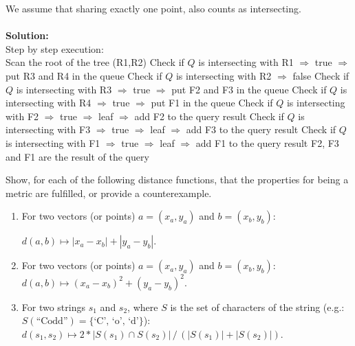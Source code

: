 \begin{enumerate}
  We assume that sharing exactly one point, also counts as intersecting.\\\\
  {\bf Solution:}\\
Step by step execution:\\
  \subitem
  Scan the root of the tree (R1,R2)
  \subitem
  Check if $Q$ is intersecting with R1 $\Rightarrow$ true $\Rightarrow$ put R3 and R4 in the queue
  \subitem
  Check if $Q$ is intersecting with R2 $\Rightarrow$ false
  \subitem
  Check if $Q$ is intersecting with R3 $\Rightarrow$ true $\Rightarrow$ put F2 and F3 in the queue
  \subitem
  Check if $Q$ is intersecting with R4 $\Rightarrow$ true $\Rightarrow$ put F1 in the queue
  \subitem
  Check if $Q$ is intersecting with F2 $\Rightarrow$ true $\Rightarrow$ leaf $\Rightarrow$ add F2 to the query result
  \subitem
  Check if $Q$ is intersecting with F3 $\Rightarrow$ true $\Rightarrow$ leaf $\Rightarrow$ add F3 to the query result
  \subitem
  Check if $Q$ is intersecting with F1 $\Rightarrow$ true $\Rightarrow$ leaf $\Rightarrow$ add F1 to the query result
  {\subitem
  F2, F3 and F1 are the result of the query}

\end{enumerate}


Show, for each of the following distance functions, that the properties for being a metric are fulfilled, or provide a counterexample.

    \begin{enumerate}

   \item\label{l1} 
   For two vectors (or points) $a=(x_a, y_a)$ and $b=(x_b, y_b)$:

 $d(a, b) \mapsto | x_a - x_b | + | y_a - y_b |$.  

  \item\label{l2} 
For two vectors (or points) $a=(x_a, y_a)$ and $b=(x_b, y_b)$:
 $d(a, b) \mapsto ( x_a - x_b )^2 + ( y_a - y_b )^2$.

      \item\label{l3} 
      For two strings $s_1$ and $s_2$, where $S$ is the set of characters of the string (e.g.: $S(\text{``Codd''}) = \{\text{`C', `o', `d'}\}$):
      $d(s_1, s_2) \mapsto 2* |S(s_1) \cap S(s_2)| \, / \, (|S(s_1)| + |S(s_2)|)$.\\

    \end{enumerate}

